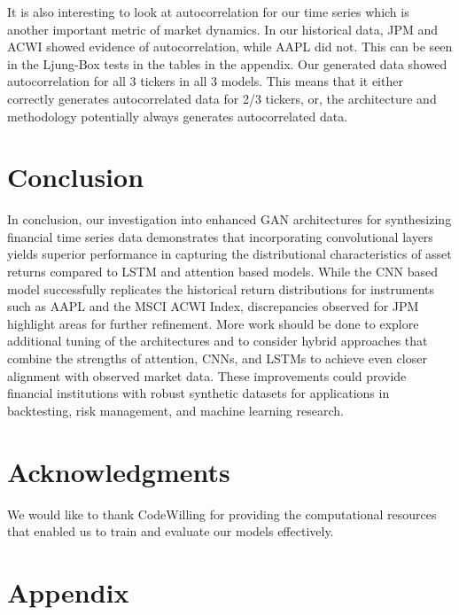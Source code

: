 \documentclass{article}
\begin{document}
It is also interesting to look at autocorrelation for our time series which is another important metric of market dynamics. In our historical data, JPM and ACWI showed evidence of autocorrelation, while AAPL did not. This can be seen in the Ljung-Box tests in the tables in the appendix. Our generated data showed autocorrelation for all 3 tickers in all 3 models. This means that it either correctly generates autocorrelated data for 2/3 tickers, or, the architecture and methodology potentially always generates autocorrelated data.

\section{Conclusion}

In conclusion, our investigation into enhanced GAN architectures for synthesizing financial time series data demonstrates that incorporating convolutional layers yields superior performance in capturing the distributional characteristics of asset returns compared to LSTM and attention based models. While the CNN based model successfully replicates the historical return distributions for instruments such as AAPL and the MSCI ACWI Index, discrepancies observed for JPM highlight areas for further refinement. More work should be done to explore additional tuning of the architectures and to consider hybrid approaches that combine the strengths of attention, CNNs, and LSTMs to achieve even closer alignment with observed market data. These improvements could provide financial institutions with robust synthetic datasets for applications in backtesting, risk management, and machine learning research.

\section*{Acknowledgments}

We would like to thank CodeWilling for providing the computational resources that enabled us to train and evaluate our models effectively.

\printbibliography

\appendix
\section{Appendix}
\end{document}
